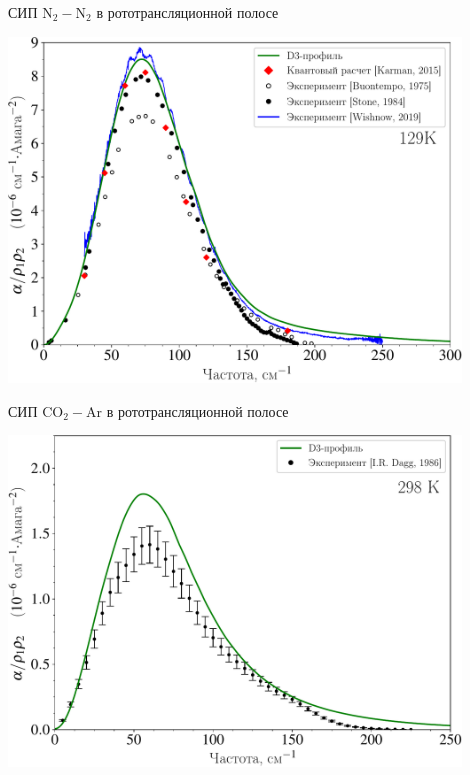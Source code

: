 \documentclass[10pt,usenames,pdf,hyperref={unicode},dvipsnames]{beamer}
\begin{document}
\begin{frame}{СИП N$_2-$N$_2$ в рототрансляционной полосе}
	\begin{center}
		\includegraphics[width=0.9\textwidth]{./pictures/129K_russian_legend-crop.pdf}
	\end{center}
\end{frame}

\begin{frame}{СИП CO$_2-$Ar в рототрансляционной полосе}
	\begin{center}
		\includegraphics[width=0.9\textwidth]{./pictures/co2ar_298K-crop.pdf}
	\end{center}
\end{frame}
\end{document}
